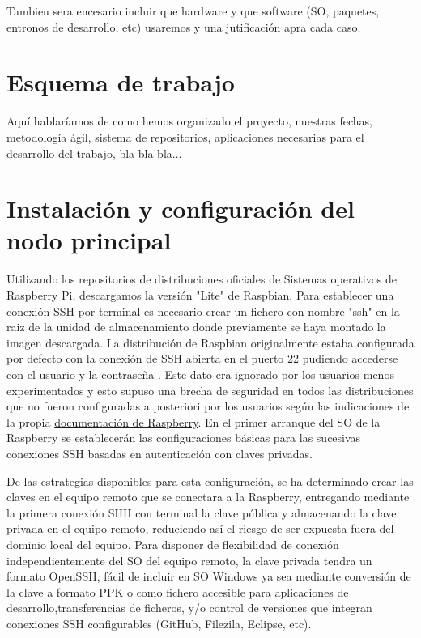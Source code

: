 Tambien sera encesario incluir que hardware y que software (SO, paquetes, entronos de desarrollo, etc) usaremos y una jutificación apra cada caso.


\section{Esquema de trabajo}
\label{makereference1.5}
Aquí hablaríamos de como hemos organizado el proyecto, nuestras fechas, metodología ágil, sistema de repositorios, aplicaciones necesarias para el desarrollo del trabajo, bla bla bla...

\section{Instalación y configuración del nodo principal}
\label{makereference1.6}
 Utilizando los repositorios de distribuciones oficiales de Sistemas operativos de Raspberry Pi, descargamos la versión "Lite" de Raspbian. Para establecer una conexión SSH por terminal es necesario crear un fichero con nombre "ssh" en la raiz de la unidad de almacenamiento donde previamente se haya montado la imagen descargada. La distribución de Raspbian originalmente estaba configurada por defecto con la conexión de SSH abierta en el puerto 22 pudiendo accederse con el usuario  y la contraseña . Este dato era ignorado por los usuarios menos experimentados y esto supuso una brecha de seguridad en todos las distribuciones que no fueron configuradas a posteriori por los usuarios según las indicaciones de la propia \href{https://www.raspberrypi.org/documentation/configuration/security.md}{ documentación de Raspberry}. En el primer arranque del SO de la Raspberry se establecerán las configuraciones básicas para las sucesivas conexiones SSH basadas en autenticación con claves privadas.
 
 De las estrategias disponibles para esta configuración, se ha determinado crear las claves en el equipo remoto que se conectara a la Raspberry, entregando mediante la primera conexión SHH con terminal la clave pública y almacenando la clave privada en el equipo remoto, reduciendo así el riesgo de ser expuesta fuera del dominio local del equipo. Para disponer de flexibilidad de conexión independientemente del SO del equipo remoto, la clave privada tendra un formato OpenSSH, fácil de incluir en SO Windows ya sea mediante conversión de la clave a formato PPK o como fichero accesible para aplicaciones de desarrollo,transferencias de ficheros, y/o control de versiones que integran conexiones SSH configurables (GitHub, Filezila, Eclipse, etc).

